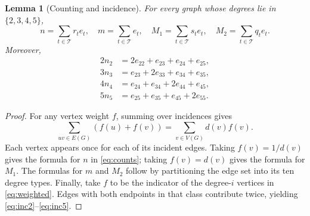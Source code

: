 \documentclass[11pt]{amsart}
\newtheorem{lemma}[theorem]{Lemma}
\theoremstyle{definition}
\theoremstyle{remark}
\newcommand{\T}{\mathcal T}
\begin{document}
\begin{lemma}[Counting and incidence]\label{lem:counting}
For every graph whose degrees lie in $\{2,3,4,5\}$,
\begin{equation}\label{eq:counts}
 n=\sum_{t\in\T}r_te_t,\quad
 m=\sum_{t\in\T}e_t,\quad
 M_1=\sum_{t\in\T}s_te_t,\quad
 M_2=\sum_{t\in\T}q_te_t.
\end{equation}
Moreover,
\begin{align}
 2n_2&=2e_{22}+e_{23}+e_{24}+e_{25},\label{eq:inc2}\\
 3n_3&=e_{23}+2e_{33}+e_{34}+e_{35},\label{eq:inc3}\\
 4n_4&=e_{24}+e_{34}+2e_{44}+e_{45},\label{eq:inc4}\\
 5n_5&=e_{25}+e_{35}+e_{45}+2e_{55}.\label{eq:inc5}
\end{align}
\end{lemma}
\begin{proof}
For any vertex weight $f$, summing over incidences gives
\begin{equation}\label{eq:weighted}
 \sum_{uv\in E(G)}(f(u)+f(v))=\sum_{v\in V(G)}d(v)f(v).
\end{equation}
Each vertex appears once for each of its incident edges. Taking $f(v)=1/d(v)$ gives the formula for $n$ in \eqref{eq:counts}; taking $f(v)=d(v)$ gives the formula for $M_1$. The formulas for $m$ and $M_2$ follow by partitioning the edge set into its ten degree types. Finally, take $f$ to be the indicator of the degree-$i$ vertices in \eqref{eq:weighted}. Edges with both endpoints in that class contribute twice, yielding \eqref{eq:inc2}--\eqref{eq:inc5}.
\end{proof}
\end{document}
